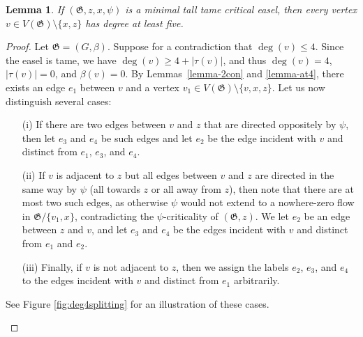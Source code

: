 \documentclass{article}
\newcommand\g{\mathfrak{G}}
\newtheorem{lemma}[theorem]{Lemma}
\begin{document}
\begin{lemma}\label{lemma-no4}
If $(\g,z,x,\psi)$ is a minimal tall tame critical easel, then every vertex $v\in V(\g)\setminus\{x,z\}$ has degree at least five.
\end{lemma}
\begin{proof}
Let $\g=(G,\beta)$.  Suppose for a contradiction that $\deg(v)\le 4$.  Since the easel is tame, we have $\deg(v)\ge 4+|\tau(v)|$, and thus $\deg(v)=4$, $|\tau(v)|=0$, and $\beta(v)=0$.  By Lemmas~\ref{lemma-2con} and \ref{lemma-at4},
there exists an edge $e_1$ between $v$ and a vertex $v_1\in V(\g)\setminus\{v,x,z\}$.
Let us now distinguish several cases:
\begin{itemize}
\item[(i)] If there are two edges between $v$ and $z$ that are directed oppositely by $\psi$, then let $e_3$ and $e_4$ be such edges
and let $e_2$ be the edge incident with $v$ and distinct from $e_1$, $e_3$, and $e_4$.
\item[(ii)] If $v$ is adjacent to $z$ but all edges between $v$ and $z$ are directed in the same way by $\psi$ (all towards $z$ or all away from $z$),
then note that there are at most two such edges, as otherwise $\psi$ would not extend to a nowhere-zero flow
in $\g/\{v_1,x\}$, contradicting the $\psi$-criticality of $(\g,z)$.  We let $e_2$ be an edge between $z$ and $v$,
and let $e_3$ and $e_4$ be the edges incident with $v$ and distinct from $e_1$ and $e_2$.
\item[(iii)] Finally, if $v$ is not adjacent to $z$, then we assign the labels $e_2$, $e_3$, and $e_4$ to
the edges incident with $v$ and distinct from $e_1$ arbitrarily.
\end{itemize}
See Figure \ref{fig:deg4splitting} for an illustration of these cases.

\begin{figure}
\begin{center}
\end{center}
\end{figure}
\end{proof}
\end{document}
